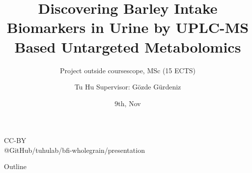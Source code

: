 \documentclass{beamer}
\title{Discovering Barley Intake Biomarkers in Urine by UPLC-MS Based Untargeted Metabolomics}
\subtitle{Project outside coursescope, MSc (15 ECTS)}
\author{Tu Hu \newline \tiny{ Supervisor: Gözde Gürdeniz}}
\institute{University of Copenhagen}
\date{9th, Nov}
\begin{document}
\begin{frame}
  \titlepage
  \tiny{CC-BY}\\
  \tiny{@GitHub/tuhulab/bfi-wholegrain/presentation}
\end{frame}

\begin{frame}{Outline}
  \tableofcontents
\end{frame}
\end{document}
